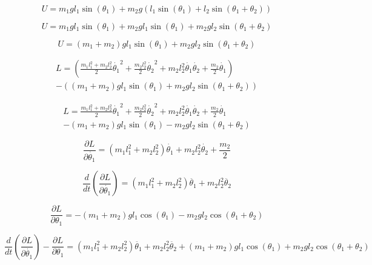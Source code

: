 \documentclass[fleqn]{article}
\begin{document}
\begin{equation}
U = m_1gl_1\sin(\theta_1) + m_2g(l_1\sin(\theta_1)+l_2\sin(\theta_1+\theta_2))
\end{equation}

\begin{equation}
U = m_1gl_1\sin(\theta_1) + m_2gl_1\sin(\theta_1)+m_2gl_2\sin(\theta_1+\theta_2)
\end{equation}

\begin{equation}
U = (m_1+m_2)gl_1\sin(\theta_1)+m_2gl_2\sin(\theta_1+\theta_2)
\end{equation}

\begin{equation}
\begin{split}
L = (\frac{m_1l_1^2+m_2l_2^2}{2}\dot{\theta_1}^2 + \frac{m_2l_2^2}{2}\dot{\theta_2}^2+m_2l_2^2\dot{\theta_1}\dot{\theta_2}+\frac{m_2}{2}\dot{\theta_1}) \\
- ((m_1+m_2)gl_1\sin(\theta_1)+m_2gl_2\sin(\theta_1+\theta_2))
\end{split}
\end{equation}

\begin{equation}
\begin{split}
L = \frac{m_1l_1^2+m_2l_2^2}{2}\dot{\theta_1}^2 + \frac{m_2l_2^2}{2}\dot{\theta_2}^2+m_2l_2^2\dot{\theta_1}\dot{\theta_2}+\frac{m_2}{2}\dot{\theta_1} \\
- (m_1+m_2)gl_1\sin(\theta_1)-m_2gl_2\sin(\theta_1+\theta_2)
\end{split}
\end{equation}

\begin{equation}
\frac{\partial{L}}{\partial{\dot{\theta_1}}} = (m_1l_1^2+m_2l_2^2)\dot{\theta_1} + m_2l_2^2\dot{\theta_2}+\frac{m_2}{2}
\end{equation}

\begin{equation}
\frac{d}{dt}\left(\frac{\partial{L}}{\partial{\dot{\theta_1}}}\right) = (m_1l_1^2+m_2l_2^2)\ddot{\theta_1} + m_2l_2^2\ddot{\theta_2}
\end{equation}

\begin{equation}
\frac{\partial{L}}{\partial{\theta_1}} = - (m_1+m_2)gl_1\cos(\theta_1)-m_2gl_2\cos(\theta_1+\theta_2)
\end{equation}

\begin{equation}
\frac{d}{dt}\left(\frac{\partial{L}}{\partial{\dot{\theta_1}}}\right) - \frac{\partial{L}}{\partial{\theta_1}} = (m_1l_1^2+m_2l_2^2)\ddot{\theta_1} + m_2l_2^2\ddot{\theta_2} + (m_1+m_2)gl_1\cos(\theta_1)+m_2gl_2\cos(\theta_1+\theta_2)
\end{equation}
\end{document}

